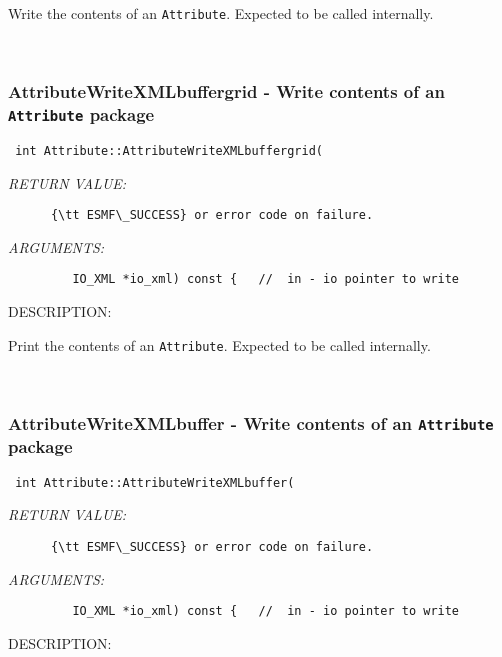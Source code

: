       Write the contents of an {\tt Attribute}.  Expected to be
      called internally.
   
 
\mbox{}\hrulefill\
 
\subsubsection [AttributeWriteXMLbuffergrid] {AttributeWriteXMLbuffergrid - Write contents of an {\tt Attribute} package}


  
\begin{verbatim} int Attribute::AttributeWriteXMLbuffergrid(\end{verbatim}{\em RETURN VALUE:}
\begin{verbatim}      {\tt ESMF\_SUCCESS} or error code on failure.\end{verbatim}{\em ARGUMENTS:}
\begin{verbatim}         IO_XML *io_xml) const {   //  in - io pointer to write\end{verbatim}
{\sf DESCRIPTION:\\ }


      Print the contents of an {\tt Attribute}.  Expected to be
      called internally.
   
 
\mbox{}\hrulefill\
 
\subsubsection [AttributeWriteXMLbuffer] {AttributeWriteXMLbuffer - Write contents of an {\tt Attribute} package}


  
\begin{verbatim} int Attribute::AttributeWriteXMLbuffer(\end{verbatim}{\em RETURN VALUE:}
\begin{verbatim}      {\tt ESMF\_SUCCESS} or error code on failure.\end{verbatim}{\em ARGUMENTS:}
\begin{verbatim}         IO_XML *io_xml) const {   //  in - io pointer to write\end{verbatim}
{\sf DESCRIPTION:\\ }


